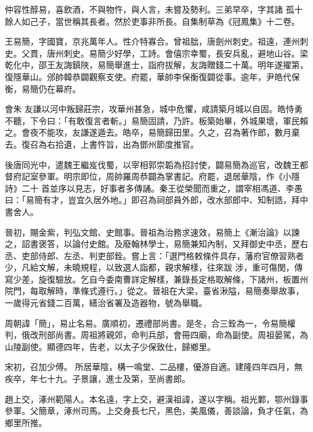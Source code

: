 \begin{pinyinscope}
 仲容性醇易，喜飲酒，不與物忤，與人言，未嘗及勢利。三弟早卒，字其諸
 孤十餘人如己子，當世稱其長者。然於吏事非所長。自集制草為《冠鳳集》十二卷。



 王易簡，字國寶，京兆萬年人。性介特寡合。曾祖朏，唐劍州刺史。祖遠，連州刺史。父貫，唐州刺史。易簡少好學，工詩。會僖宗幸蜀，長安兵亂，避地山谷。梁乾化中，邵王友誨鎮陜，易簡舉進士，詣府拔解，友誨贈錢二十萬。明年遂擢第，復隱華山。邠帥韓恭闢觀察支使。府罷，華帥李保衡復闢從事。逾年，尹皓代保衡，易簡仍在幕府。



 會朱
 友謙以河中叛歸莊宗，攻華州甚急，城中危懼，咸請築月城以自固。皓恃勇不聽，下令曰：「有敢復言者斬。」易簡固請，乃許。板築始畢，外城果壞，軍民賴之。會夜不能攻，友謙遂遁去。皓卒，易簡歸田里。久之，召為著作郎，數月棄去。復召為右拾遺，上書忤旨，出為鄧州節度推官。



 後唐同光中，遣魏王繼岌伐蜀，以宰相郭崇韜為招討使，闢易簡為巡官，改魏王都督府記室參軍。明宗即位，周帥羅周恭闢為掌書記。府罷，退居華陰，作《小隱詩》二十
 首並序以見志，好事者多傳誦。秦王從榮聞而重之，謂宰相馮道、李愚曰：「易簡有才，豈宜久居外地。」即召為祠部員外郎，改水部郎中、知制誥，拜中書舍人。



 晉初，賜金紫，判弘文館、史館事。晉祖為治務求速效，易簡上《漸治論》以諫之，詔書褒答，以論付史館。及廢翰林學士，易簡兼知內制，又拜御史中丞，歷右丞、吏部侍郎、左丞、判吏部銓。嘗上言：「選門格敕條件具存，藩府官僚習熟者少，凡給文解，未曉規程，以致選人詣都，親求解樣，往來跋
 涉，重可傷閔，傳寫少差，旋復驗放。乞自今委南曹詳定解樣，兼錄長定格取解條，下諸州，板置州院門，每取解時，準條式遵行。」從之。晉祖在大梁，臺省湫隘，易簡奏舉故事，一歲得元省錢二百萬，繕治省署及造器物，號為舉職。



 周朝諱「簡」，易止名易。廣順初，遷禮部尚書。是冬，合三銓為一，令易簡權判，俄改刑部尚書。周祖將親郊，命判兵部，會冊四廟，命為副使。周祖晏駕，為山陵副使。顯德四年，告老，以太子少保致仕，歸鄉里。



 宋初，召加少傅。
 所居華陰，構一鳴堂、二品樓，優游自適。建隆四年四月，無疾卒，年七十九。子景讓，進士及第，至尚書郎。



 趙上交，涿州範陽人。本名遠，字上交，避漢祖諱，遂以字稱。祖光鄴，鄂州錄事參軍。父簡章，涿州司馬。上交身長七尺，黑色，美風儀，善談論，負才任氣，為鄉里所推。




\end{pinyinscope}
